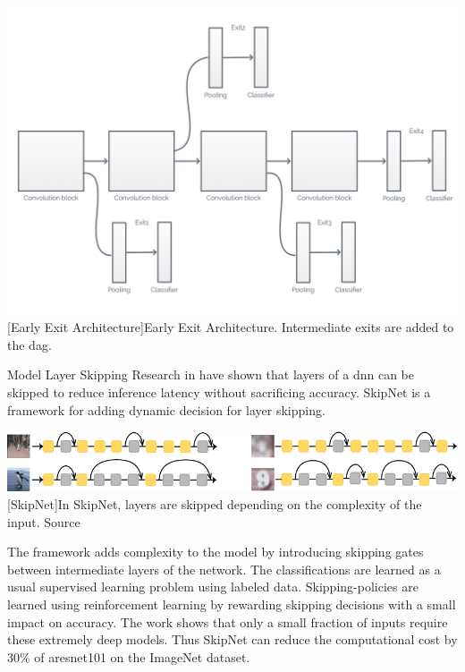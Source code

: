 \begin{enumdescript}
	\begin{minipage}[t]{\linewidth}    
		\centering                          
		\includegraphics[width=.7\linewidth]{figures/models/branchy}
		[Early Exit Architecture]{Early Exit Architecture. Intermediate exits are added to the \acrfull{dag}.}
		\label{fig:branchynet}
	\end{minipage}
	
	\item[Model Layer Skipping] Research in \cite{wang_skipnet:_2017, wu_blockdrop:_2017}  have shown that layers of a \gls{dnn} can be skipped to reduce inference latency without sacrificing accuracy. SkipNet \cite{wang_skipnet:_2017} is a framework for adding dynamic decision for layer skipping. 
	
	\begin{minipage}[t]{\linewidth}    
		\centering                          
		\includegraphics[width=.8\linewidth]{figures/models/skipnet}
		[SkipNet]{In SkipNet, layers are skipped depending on the complexity of the input. Source  \cite{wang_skipnet:_2017}}
	\end{minipage}
	
	The framework adds complexity to the model by introducing skipping gates between intermediate layers of the network. The classifications are learned as a usual supervised learning problem using labeled data. Skipping-policies are learned using reinforcement learning by rewarding skipping decisions with a small impact on accuracy. The work shows that only a small fraction of inputs require these extremely deep models. Thus SkipNet can reduce the computational cost by 30\% of a\gls{resnet}101 on the ImageNet dataset. 
	

\end{enumdescript}
